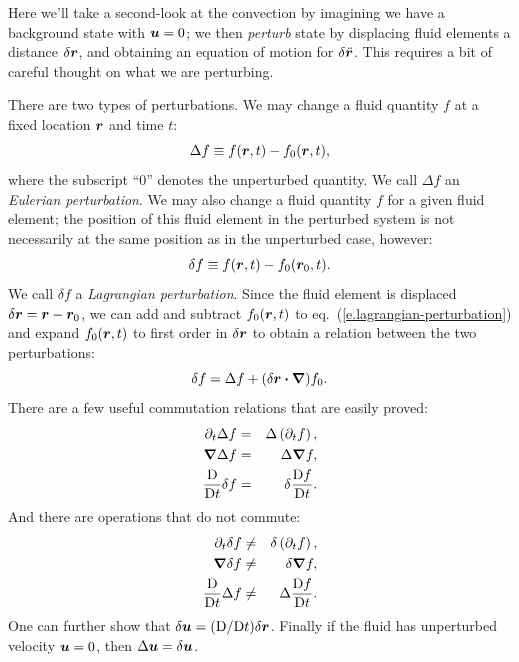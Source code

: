 Here we'll take a second-look at the convection by imagining we have a background state with $\boldsymbol{u}=0$; we then \emph{perturb} state by displacing fluid elements a distance $\delta\boldsymbol{r}$, and obtaining an equation of motion for $\delta\ddot{\boldsymbol{r}}$.  This requires a bit of careful thought on what we are perturbing.

There are two types of perturbations. We may change a fluid quantity $f$ at a fixed location $\boldsymbol{r}$ and time $t$:
\begin{equation}\label{e.eulerian-perturbation}
  \Delta f \equiv f(\boldsymbol{r},t)-f_{0}(\boldsymbol{r},t),
\end{equation}
where the subscript ``0'' denotes the unperturbed quantity.  We call $\Delta f$ an \emph{Eulerian perturbation}.  We may also change a fluid quantity $f$ for a given fluid element; the position of this fluid element in the perturbed system is not necessarily at the same position as in the unperturbed case, however:
\begin{equation}\label{e.lagrangian-perturbation}
 \delta f \equiv f(\boldsymbol{r},t) - f_{0}(\boldsymbol{r}_{0},t).
\end{equation}
We call $\delta f$ a \emph{Lagrangian perturbation}. Since the fluid element is displaced $\delta\boldsymbol{r} = \boldsymbol{r}-\boldsymbol{r}_{0}$, we can add and subtract $f_{0}(\boldsymbol{r},t)$ to eq.~(\ref{e.lagrangian-perturbation}) and expand $f_{0}(\boldsymbol{r},t)$ to first order in $\delta \boldsymbol{r}$ to obtain a relation between the two perturbations:
\begin{equation}\label{e.perturbation-relation}
\delta f = \Delta f + (\delta\boldsymbol{r}\boldsymbol{\cdot}\boldsymbol{\nabla})f_{0}.
\end{equation}
There are a few useful commutation relations that are easily proved:
\begin{eqnarray}
\partial_{t}\Delta f &=& \Delta\left(\partial_{t}f\right),\\
\boldsymbol{\nabla} \Delta f &=& \Delta \boldsymbol{\nabla} f,\\
\frac{\mathrm{D}}{\mathrm{D} t}\delta f &=& \delta \frac{\mathrm{D} f}{\mathrm{D} t}.
\end{eqnarray}
And there are operations that do not commute:
\begin{eqnarray}
\partial_{t}\delta f &\neq& \delta\left(\partial_{t}f\right),\\
\boldsymbol{\nabla} \delta f &\neq& \delta \boldsymbol{\nabla} f,\\
\frac{\mathrm{D}}{\mathrm{D} t}\Delta f &\neq& \Delta \frac{\mathrm{D} f}{\mathrm{D} t}.
\end{eqnarray}
One can further show that $\delta\boldsymbol{u} = (\mathrm{D}/\mathrm{D} t)\delta \boldsymbol{r}$. Finally if the fluid has unperturbed velocity $\boldsymbol{u} = 0$, then $\Delta \boldsymbol{u} = \delta \boldsymbol{u}$.


